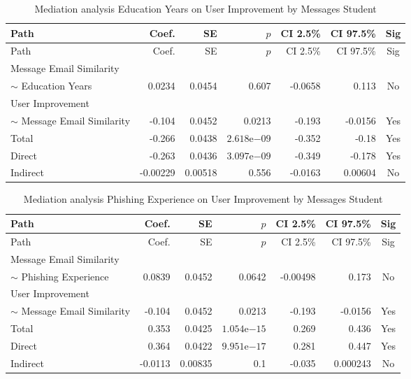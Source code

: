 \begin{longtable}{lrrrrrc}
            \caption{Mediation analysis Education Years on User Improvement by  Messages Student}\label{tab:mediation Education Years on User Improvement by  Messages Student}\\
            \toprule
            Path & Coef. & SE & $p$ & CI 2.5\% & CI 97.5\% & Sig \\
            \midrule
            \endfirsthead
            \toprule
            Path & Coef. & SE & $p$ & CI 2.5\% & CI 97.5\% & Sig \\
            \midrule
            \endhead
            \bottomrule
            \endfoot
            Message Email Similarity\\ $\sim$ Education Years & 0.0234 & 0.0454 & 0.607 & -0.0658 & 0.113 & No \\
User Improvement\\ $\sim$ Message Email Similarity & -0.104 & 0.0452 & 0.0213 & -0.193 & -0.0156 & Yes \\
Total & -0.266 & 0.0438 & $2.618\mathrm{e}{-09}$ & -0.352 & -0.18 & Yes \\
Direct & -0.263 & 0.0436 & $3.097\mathrm{e}{-09}$ & -0.349 & -0.178 & Yes \\
Indirect & -0.00229 & 0.00518 & 0.556 & -0.0163 & 0.00604 & No \\
\end{longtable}

\begin{longtable}{lrrrrrc}
            \caption{Mediation analysis Phishing Experience on User Improvement by  Messages Student}\label{tab:mediation Phishing Experience on User Improvement by  Messages Student}\\
            \toprule
            Path & Coef. & SE & $p$ & CI 2.5\% & CI 97.5\% & Sig \\
            \midrule
            \endfirsthead
            \toprule
            Path & Coef. & SE & $p$ & CI 2.5\% & CI 97.5\% & Sig \\
            \midrule
            \endhead
            \bottomrule
            \endfoot
            Message Email Similarity\\ $\sim$ Phishing Experience & 0.0839 & 0.0452 & 0.0642 & -0.00498 & 0.173 & No \\
User Improvement\\ $\sim$ Message Email Similarity & -0.104 & 0.0452 & 0.0213 & -0.193 & -0.0156 & Yes \\
Total & 0.353 & 0.0425 & $1.054\mathrm{e}{-15}$ & 0.269 & 0.436 & Yes \\
Direct & 0.364 & 0.0422 & $9.951\mathrm{e}{-17}$ & 0.281 & 0.447 & Yes \\
Indirect & -0.0113 & 0.00835 & 0.1 & -0.035 & 0.000243 & No \\
\end{longtable}

